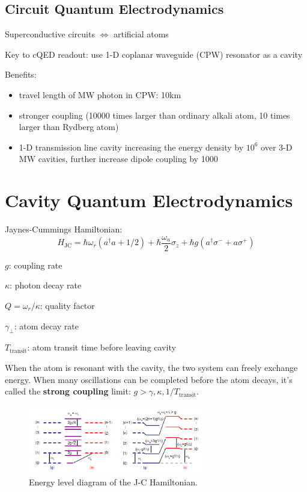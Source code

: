 \documentclass[8pt,a4paper,twocolumn]{article} %
\numberwithin{equation}{section} %
\begin{document}
		\subsection{Circuit Quantum Electrodynamics} %
		\label{sub:circuit_quantum_electrodynamics}
			Superconductive circuits $\Longleftrightarrow $ artificial atoms

			Key to cQED readout: use 1-D coplanar waveguide (CPW) resonator as a cavity

			Benefits:
			\begin{itemize}
				\item travel length of MW photon in CPW: 10km
				\item stronger coupling (10000 times larger than ordinary alkali atom, 10 times larger than Rydberg atom)
				\item 1-D transmission line cavity increasing the energy density by $10^6$ over 3-D MW cavities, further increase dipole coupling by 1000
			\end{itemize}



	\section{Cavity Quantum Electrodynamics} %
	\label{sec:cavity_quantum_electrodynamics}
		Jaynes-Cummings Hamiltonian:
		\begin{equation}
			H_{\text{JC}} = \hbar \omega_r (a^{\dagger}a+1/2)+ \hbar \frac{\omega_a}{2} \sigma_z + \hbar g ( a^{\dagger} \sigma^- + a \sigma^+ )
		\end{equation}

		$g $: coupling rate

		$\kappa $: photon decay rate

		$ Q=\omega_r/\kappa $: quality factor

		$ \gamma_{\perp} $: atom decay rate

		$T_{\text{transit}}$: atom transit time before leaving cavity

		When the atom is resonant with the cavity, the two system can freely exchange energy. When many oscillations can be completed before the atom decays, it's called the \textbf{strong coupling} limit: $g>\gamma,\kappa,1/T_{\text{transit}} $.

		\begin{figure}[!h]
			\centering
			\includegraphics[width=3in]{JClevels.png}
			\caption{Energy level diagram of the J-C Hamiltonian. \cite{Schuster2007}}
			\label{pic:EnLevelOfJCH}
		\end{figure}
\end{document}
